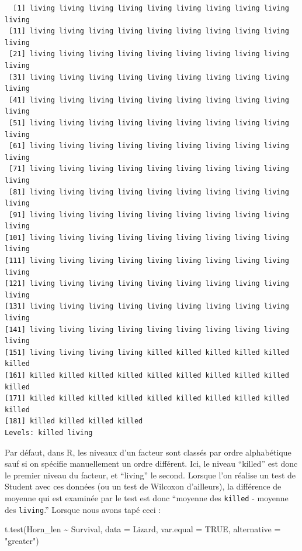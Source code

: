 \documentclass[
  a4paper,
]{article}
\newenvironment{Shaded}{\begin{snugshade}}{\end{snugshade}}
\newcommand{\AttributeTok}[1]{\textcolor[rgb]{0.00,0.34,0.68}{#1}}
\newcommand{\ConstantTok}[1]{\textcolor[rgb]{0.67,0.33,0.00}{#1}}
\newcommand{\FunctionTok}[1]{\textcolor[rgb]{0.39,0.29,0.61}{#1}}
\newcommand{\NormalTok}[1]{\textcolor[rgb]{0.12,0.11,0.11}{#1}}
\newcommand{\SpecialCharTok}[1]{\textcolor[rgb]{0.24,0.68,0.91}{#1}}
\newcommand{\StringTok}[1]{\textcolor[rgb]{0.75,0.01,0.01}{#1}}
\begin{document}
\begin{verbatim}
  [1] living living living living living living living living living living
 [11] living living living living living living living living living living
 [21] living living living living living living living living living living
 [31] living living living living living living living living living living
 [41] living living living living living living living living living living
 [51] living living living living living living living living living living
 [61] living living living living living living living living living living
 [71] living living living living living living living living living living
 [81] living living living living living living living living living living
 [91] living living living living living living living living living living
[101] living living living living living living living living living living
[111] living living living living living living living living living living
[121] living living living living living living living living living living
[131] living living living living living living living living living living
[141] living living living living living living living living living living
[151] living living living living killed killed killed killed killed killed
[161] killed killed killed killed killed killed killed killed killed killed
[171] killed killed killed killed killed killed killed killed killed killed
[181] killed killed killed killed
Levels: killed living
\end{verbatim}

Par défaut, dans R, les niveaux d'un facteur sont classés par ordre alphabétique sauf si on spécifie manuellement un ordre différent. Ici, le niveau ``killed'' est donc le premier niveau du facteur, et ``living'' le second. Lorsque l'on réalise un test de Student avec ces données (ou un test de Wilcoxon d'ailleurs), la différence de moyenne qui est examinée par le test est donc ``moyenne des \texttt{killed} - moyenne des \texttt{living}.'' Lorsque nous avons tapé ceci :

\begin{Shaded}
\begin{Highlighting}[]
\FunctionTok{t.test}\NormalTok{(Horn\_len }\SpecialCharTok{\textasciitilde{}}\NormalTok{ Survival, }
       \AttributeTok{data =}\NormalTok{ Lizard, }\AttributeTok{var.equal =} \ConstantTok{TRUE}\NormalTok{,}
       \AttributeTok{alternative =} \StringTok{"greater"}\NormalTok{)}
\end{Highlighting}
\end{Shaded}
\end{document}
